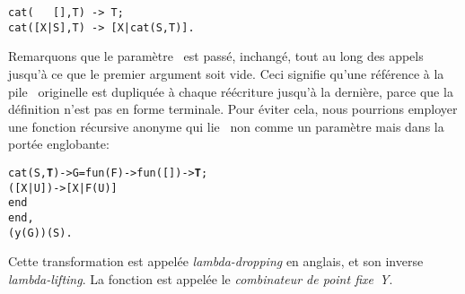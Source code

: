 \begin{verbatim}
cat(   [],T) -> T;
cat([X|S],T) -> [X|cat(S,T)].
\end{verbatim}
Remarquons que le paramètre~ est passé, inchangé, tout au
long des appels jusqu'à ce que le premier argument soit vide. Ceci
signifie qu'une référence à la pile~ originelle est
dupliquée à chaque réécriture jusqu'à la dernière, parce que la
définition n'est pas en forme terminale. Pour éviter cela, nous
pourrions employer une fonction récursive anonyme qui lie~
non comme un paramètre mais dans la portée englobante:
\begin{alltt}
cat(S,\textbf{T}) -> G = fun(F) -> fun(   []) -> \textbf{T};\hfill% T \emph{visible}
                             ([X|U]) -> [X|F(U)]
                          end
                end,
            (y(G))(S).
\end{alltt}
Cette transformation est appelée
\emph{lambda-dropping} en anglais, et son inverse
\emph{lambda-lifting}. La fonction
 est appelée le \emph{combinateur de point fixe~Y}.

